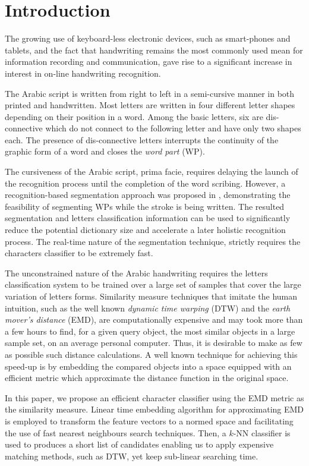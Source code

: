 \documentclass[10pt, conference, compsocconf]{IEEEtran}
\begin{document}
\section{Introduction}
The growing use of keyboard-less electronic devices, such as smart-phones and tablets, and the fact that handwriting remains the most commonly used mean for information recording and communication, gave rise to a significant increase in interest in on-line handwriting recognition.

The Arabic script is written from right to left in a semi-cursive manner in both printed and handwritten. 
Most letters are written in four different letter shapes depending on their position in a word.
Among the basic letters, six are dis-connective which do not connect to the following letter and have only two shapes each. 
The presence of dis-connective letters interrupts the continuity of the graphic form of a word and closes the \emph{word part} (WP).

The cursiveness of the Arabic script, prima facie, requires delaying the launch of the recognition process until the completion of the word scribing.
However, a recognition-based segmentation approach was proposed in \cite{kour2014real}, demonstrating the feasibility of segmenting WPs while the stroke is being written.
The resulted segmentation and letters classification information can be used to significantly reduce the potential dictionary size and accelerate a later holistic recognition process.
The real-time nature of the segmentation technique, strictly requires the characters classifier to be extremely fast.

The unconstrained nature of the Arabic handwriting requires the letters classification system to be trained over a large set of samples that cover the large variation of letters forms.
Similarity measure techniques that imitate the human intuition, such as the well known \emph{dynamic time warping} (DTW) and the \emph{earth mover's distance} (EMD), are computationally expensive and may took more than a few hours to find, for a given query object, the most similar objects in a large sample set, on an average personal computer.
Thus, it is desirable to make as few as possible such distance calculations.
A well known technique for achieving this speed-up is by embedding the compared objects into a space equipped with an efficient metric which approximate the distance function in the original space.

In this paper, we propose an efficient character classifier using the EMD metric as the similarity measure. 
Linear time embedding algorithm for approximating EMD \cite{shirdhonkar2008approximate} is employed to transform the feature vectors to a normed space and facilitating the use of fast nearest neighbours search techniques.
Then, a $k$-NN classifier is used to produces a short list of candidates enabling us to apply expensive matching methods, such as DTW, yet keep sub-linear searching time.
\end{document}
